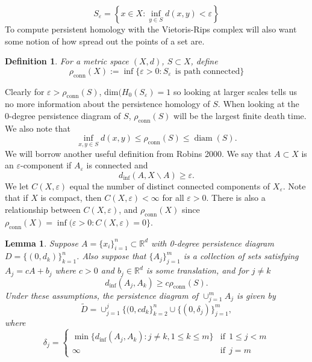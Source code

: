 \documentclass [52pt] {article}
\newcommand{\R}{\mathbb{R}}
\DeclareMathOperator{\diam}{diam}
\newtheorem{lemma}{Lemma}
\newtheorem{definition}{Definition}
\begin{document}
\[S_{\varepsilon} = \left\{x\in X: \inf_{y\in S}d(x,y)<\varepsilon\right\}\]
To compute persistent homology with the Vietoris-Rips complex will also want some notion of how spread out the points of a set are.
\begin{definition}
For a metric space $(X,d)$, $S\subset X$, define
\[\rho_{\mathrm{conn}}(X) := \inf\{\varepsilon>0:S_\varepsilon \:\:\text{is path connected}\}\]
\end{definition}
Clearly for $\varepsilon > \rho_{\mathrm{conn}}(S)$, $\text{dim}(H_0(S_{\varepsilon}) = 1$ so looking at larger scales tells us no more information about the persistence homology of $S$.  When looking at the 0-degree persistence diagram of $S$, $\rho_{\mathrm{conn}}(S)$ will be the largest finite death time.  We also note that 
\[\inf_{x,y\in S} d(x,y)\le \rho_{\mathrm{conn}}(S)\le \diam(S).\]
We will borrow another useful definition from Robins 2000.  We say that $A\subset X$ is an $\varepsilon$-component if $A_\varepsilon$ is connected and 
\[d_{\inf}(A,X\backslash A) \ge\varepsilon.\]
We let $C(X,\varepsilon)$ equal the number of distinct connected components of $X_\varepsilon$.  Note that if $X$ is compact, then $C(X,\varepsilon)<\infty$ for all $\varepsilon>0$.  There is also a relationship between $C(X,\varepsilon)$, and $\rho_{\mathrm{conn}}(X)$ since $\rho_{\mathrm{conn}}(X) = \inf(\varepsilon >0 : C(X,\varepsilon) = 0\}$.

\begin{lemma}
Suppose $A = \{x_i\}_{i=1}^n\subset\R^d$ with 0-degree persistence diagram $D = \{(0,d_k)\}_{k=1}^n$.  Also suppose that $\{A_j\}_{j=1}^m$ is a collection of sets satisfying $A_j = cA + b_j$ where $c >0$ and $b_j\in\R^d$ is some translation, and for $j\not=k$
\[d_{\inf}(A_j,A_k)\ge c\rho_{\mathrm{conn}}(S).\]
Under these assumptions, the persistence diagram of $\cup_{j=1}^mA_j$ is given by
\[\tilde{D} = \cup_{j=1}^j\{(0,cd_k\}_{k=2}^n \cup\{(0,\delta_j)\}_{j=1}^m,\]
where 
\[\delta_j = 
\begin{cases}
\min\{ d_{\inf}(A_j,A_k):j\not = k, 1\le k\le m\}  &\mathrm{if}\:\: 1\le j<m\\
\infty   &\mathrm{if}\:\: j=m
\end{cases}\]

\end{lemma}
\end{document}
